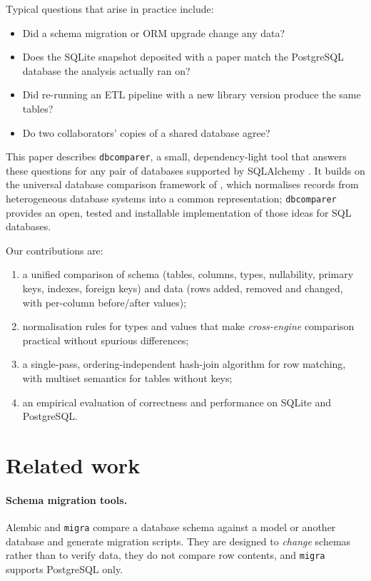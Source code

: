 \documentclass[11pt]{article}
\begin{document}
Typical questions that arise in practice include:
\begin{itemize}
  \item Did a schema migration or ORM upgrade change any data?
  \item Does the SQLite snapshot deposited with a paper match the
        PostgreSQL database the analysis actually ran on?
  \item Did re-running an ETL pipeline with a new library version produce
        the same tables?
  \item Do two collaborators' copies of a shared database agree?
\end{itemize}

This paper describes \texttt{dbcomparer}, a small, dependency-light tool
that answers these questions for any pair of databases supported by
SQLAlchemy \citep{sqlalchemy}. It builds on the universal database
comparison framework of \citet{rai2026universal}, which normalises records
from heterogeneous database systems into a common representation;
\texttt{dbcomparer} provides an open, tested and installable implementation
of those ideas for SQL databases.

Our contributions are:
\begin{enumerate}
  \item a unified comparison of schema (tables, columns, types,
        nullability, primary keys, indexes, foreign keys) and data (rows
        added, removed and changed, with per-column before/after values);
  \item normalisation rules for types and values that make
        \emph{cross-engine} comparison practical without spurious
        differences;
  \item a single-pass, ordering-independent hash-join algorithm for row
        matching, with multiset semantics for tables without keys;
  \item an empirical evaluation of correctness and performance on SQLite
        and PostgreSQL.
\end{enumerate}

\section{Related work}

\paragraph{Schema migration tools.} Alembic \citep{alembic} and
\texttt{migra} \citep{migra} compare a database schema against a model or
another database and generate migration scripts. They are designed to
\emph{change} schemas rather than to verify data, they do not compare row
contents, and \texttt{migra} supports PostgreSQL only.
\end{document}
